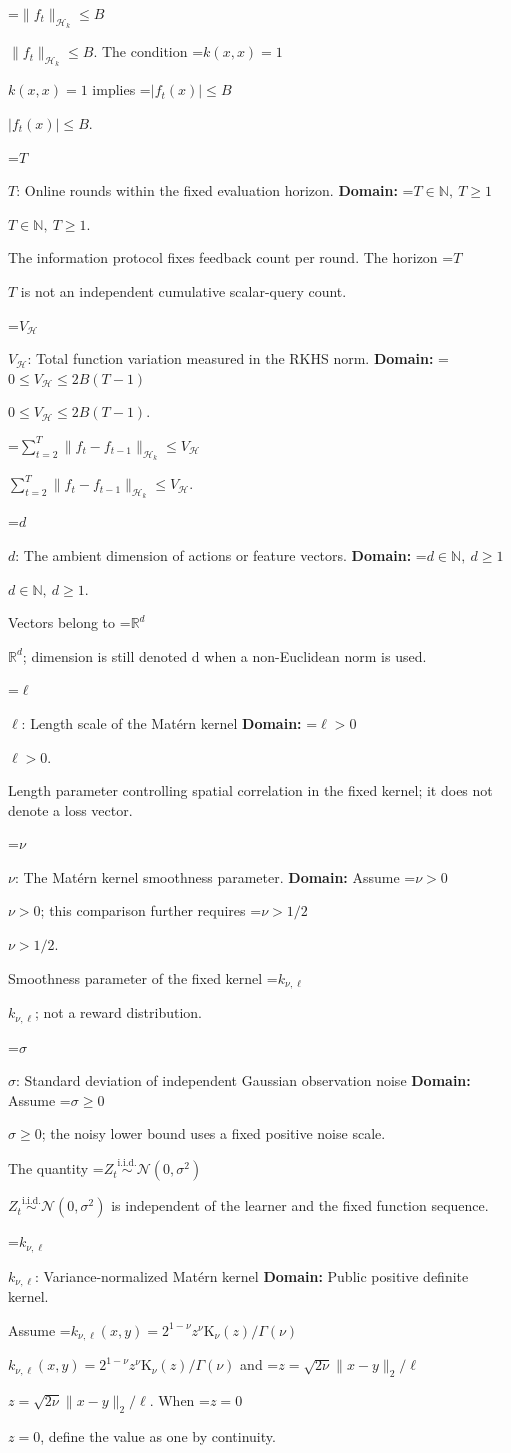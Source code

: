 \documentclass[10pt,a4paper]{article}
\newcommand{\AtlasMath}[1]{\par\begingroup\centering\setbox0=\hbox{$\displaystyle #1$}\ifdim\wd0>1.4\linewidth\typeout{ATLAS WIDE FORMULA: \the\wd0}\fi\ifdim\wd0>\linewidth\resizebox{\linewidth}{!}{\box0}\else\box0\fi\par\endgroup}
\newcommand{\AtlasInlineMath}[1]{\begingroup\setbox0=\hbox{$#1$}\ifdim\wd0>.4\linewidth\endgroup\AtlasMath{#1}\else\endgroup$#1$\fi}
\begin{document}
\AtlasInlineMath{\|f_t\|_{\mathcal H_k}\le B}. The condition \AtlasInlineMath{k(x,x)=1} implies \AtlasInlineMath{|f_t(x)|\le B}.

\AtlasInlineMath{T}: Online rounds within the fixed evaluation horizon. \textbf{Domain:} \AtlasInlineMath{T\in\mathbb N,\ T\ge1}.

The information protocol fixes feedback count per round. The horizon \AtlasInlineMath{T} is not an independent cumulative scalar-query count.

\AtlasInlineMath{V_{\mathcal H}}: Total function variation measured in the RKHS norm. \textbf{Domain:} \AtlasInlineMath{0\le V_{\mathcal H}\le2B(T-1)}.

\AtlasInlineMath{\sum_{t=2}^T\|f_t-f_{t-1}\|_{\mathcal H_k}\le V_{\mathcal H}}.

\AtlasInlineMath{d}: The ambient dimension of actions or feature vectors. \textbf{Domain:} \AtlasInlineMath{d\in\mathbb N,\ d\ge1}.

Vectors belong to \AtlasInlineMath{\mathbb R^d}; dimension is still denoted d when a non-Euclidean norm is used.

\AtlasInlineMath{\ell}: Length scale of the Matérn kernel \textbf{Domain:} \AtlasInlineMath{\ell>0}.

Length parameter controlling spatial correlation in the fixed kernel; it does not denote a loss vector.

\AtlasInlineMath{\nu}: The Matérn kernel smoothness parameter. \textbf{Domain:} Assume \AtlasInlineMath{\nu>0}; this comparison further requires \AtlasInlineMath{\nu>1/2}.

Smoothness parameter of the fixed kernel \AtlasInlineMath{k_{\nu,\ell}}; not a reward distribution.

\AtlasInlineMath{\sigma}: Standard deviation of independent Gaussian observation noise \textbf{Domain:} Assume \AtlasInlineMath{\sigma\ge0}; the noisy lower bound uses a fixed positive noise scale.

The quantity \AtlasInlineMath{Z_t\overset{\mathrm{i.i.d.}}\sim\mathcal N(0,\sigma^2)} is independent of the learner and the fixed function sequence.

\AtlasInlineMath{k_{\nu,\ell}}: Variance-normalized Matérn kernel \textbf{Domain:} Public positive definite kernel.

Assume \AtlasInlineMath{k_{\nu,\ell}(x,y)=2^{1-\nu}z^\nu\mathrm K_\nu(z)/\Gamma(\nu)} and \AtlasInlineMath{z=\sqrt{2\nu}\|x-y\|_2/\ell}. When \AtlasInlineMath{z=0}, define the value as one by continuity.
\end{document}
